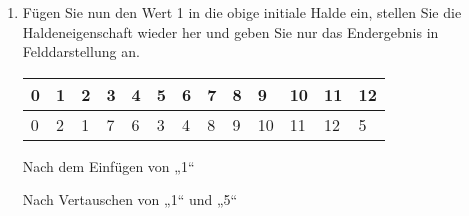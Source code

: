 \documentclass{bschlangaul-aufgabe}
\begin{document}
\begin{enumerate}
\begin{liAdditum}[zu b)]
\begin{liDiagramm}{Nach Vertauschen von „12“ und „6“}
\end{liDiagramm}

\begin{liDiagramm}{Nach Vertauschen von „12“ und „10“}
\end{liDiagramm}
\end{liAdditum}


\item Fügen Sie nun den Wert 1 in die obige initiale Halde ein, stellen
Sie die Haldeneigenschaft wieder her und geben Sie nur das Endergebnis
in Felddarstellung an.

\begin{liAntwort}
\begin{tabular}{lllllllllllll}
\bf{0}  & \bf{1}  & \bf{2}  & \bf{3}  & \bf{4}  & \bf{5}  & \bf{6}  & \bf{7}  & \bf{8}  & \bf{9}  & \bf{10} & \bf{11} & \bf{12} \\
\hline
0       & 2       & 1       & 7       & 6       & 3       & 4       & 8       & 9       & 10      & 11      & 12      & 5       \\
\end{tabular}
\end{liAntwort}

\begin{liAdditum}[zu c)]

\begin{liDiagramm}{Nach dem Einfügen von „1“}
\end{liDiagramm}

\begin{liDiagramm}{Nach Vertauschen von „1“ und „5“}
\end{liDiagramm}


\end{liAdditum}
\end{enumerate}
\end{document}
